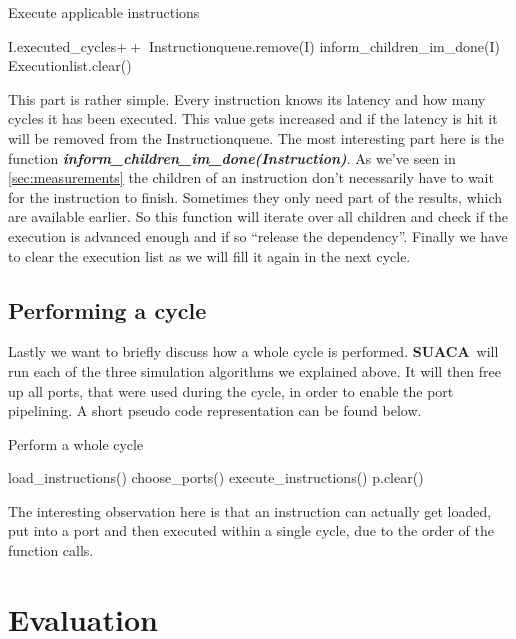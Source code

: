 \documentclass[a4paper,12pt,titlepage, twoside]{report}
\newcommand{\suaca}{\textbf{SUACA}}
\begin{document}
\begin{algorithm}[H]
    \SetAlgoLined
    \caption{Execute applicable instructions}
     {
        I.executed\_cycles$++$\;
         {
            Instructionqueue.remove(I)\;
        }
        inform\_children\_im\_done(I)\;
    }
    Executionlist.clear()\;
\end{algorithm}

This part is rather simple. Every instruction knows its latency and how many cycles it has been executed. This value gets increased and if the latency is hit it will be removed from the Instructionqueue. The most interesting part here is the function \textbf{\emph{inform\_children\_im\_done(Instruction)}}. As we've seen in \autoref{sec:measurements} the children of an instruction don't necessarily have to wait for the instruction to finish. Sometimes they only need part of the results, which are available earlier. So this function will iterate over all children and check if the execution is advanced enough and if so ``release the dependency''. Finally we have to clear the execution list as we will fill it again in the next cycle.

\section{Performing a cycle}

Lastly we want to briefly discuss how a whole cycle is performed. \suaca\ will run each of the three simulation algorithms we explained above. It will then free up all ports, that were used during the cycle, in order to enable the port pipelining. A short pseudo code representation can be found below.

\begin{algorithm}[H]
    \SetAlgoLined
    \caption{Perform a whole cycle}
    load\_instructions()\;
    choose\_ports()\;
    execute\_instructions()\;
     {
        p.clear()\;
    }
\end{algorithm}

The interesting observation here is that an instruction can actually get loaded, put into a port and then executed within a single cycle, due to the order of the function calls.

\chapter{Evaluation}

%
\printbibliography
\end{document}
